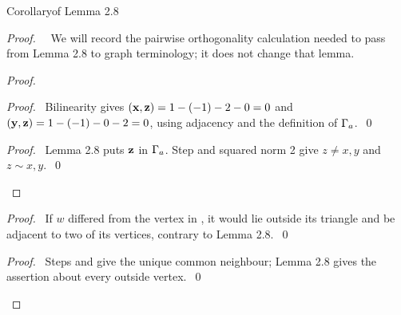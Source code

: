 \begin{namedresult}{Corollary}{of Lemma 2.8}\label{cor:triangle-property}
\end{namedresult}
\begin{proof}
 \pfsketch\ \new\ We will record the pairwise orthogonality calculation needed to pass
 from Lemma 2.8 to graph terminology; it does not change that lemma.
 \begin{proof}
  \begin{proof}
   \pf\ Bilinearity gives $({\mathbf x},{\mathbf z})=1-(-1)-2-0=0$ and
   $({\mathbf y},{\mathbf z})=1-(-1)-0-2=0$, using adjacency and the definition of $\Gamma_a$.~\qed
  \end{proof}
  \qedstep
  \begin{proof}
   \pf\ Lemma 2.8 puts ${\mathbf z}$ in $\Gamma_a$. Step  and squared norm 2
   give $z\ne x,y$ and $z\sim x,y$.~\qed
  \end{proof}
 \end{proof}
 \begin{proof}
  \pf\ If $w$ differed from the vertex in , it would lie outside
  its triangle and be adjacent to two of its vertices, contrary to Lemma 2.8.~\qed
 \end{proof}
 \qedstep
 \begin{proof}
  \pf\ Steps  and  give the unique common neighbour;
  Lemma 2.8 gives the assertion about every outside vertex.~\qed
 \end{proof}
\end{proof}


